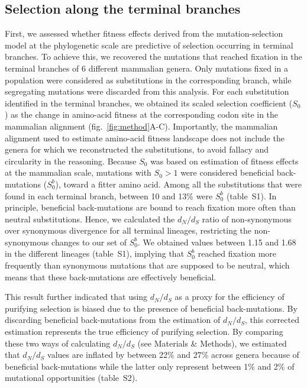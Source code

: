 \documentclass{article}
\newcommand{\dn}{d_N}
\newcommand{\ds}{d_S}
\newcommand{\dnds}{\dn / \ds}
\newcommand{\Sphy}{S_{0}}
\newcommand{\SphyBen}{\Sphy^{b}}
\begin{document}
    \subsection*{Selection along the terminal branches}
    First, we assessed whether fitness effects derived from the mutation-selection model at the phylogenetic scale are predictive of selection occurring in terminal branches.
    To achieve this, we recovered the mutations that reached fixation in the terminal branches of 6 different mammalian genera.
    Only mutations fixed in a population were considered as substitutions in the corresponding branch, while segregating mutations were discarded from this analysis.
    For each substitution identified in the terminal branches, we obtained its scaled selection coefficient ($\Sphy$) as the change in amino-acid fitness at the corresponding codon site in the mammalian alignment (fig.~\ref{fig:method}A-C).
    Importantly, the mammalian alignment used to estimate amino-acid fitness landscape does not include the genera for which we reconstructed the substitutions, to avoid fallacy and circularity in the reasoning.
    Because $\Sphy$ was based on estimation of fitness effects at the mammalian scale, mutations with $\Sphy>1$ were considered beneficial back-mutations ($\SphyBen$), toward a fitter amino acid.
    Among all the substitutions that were found in each terminal branch, between 10 and 13\% were $\SphyBen$ (table~S1).
    In principle, beneficial back-mutations are bound to reach fixation more often than neutral substitutions.
    Hence, we calculated the $\dnds$ ratio of non-synonymous over synonymous divergence for all terminal lineages, restricting the non-synonymous changes to our set of $\SphyBen$.
    We obtained values between 1.15 and 1.68 in the different lineages (table~S1), implying that $\SphyBen$ reached fixation more frequently than synonymous mutations that are supposed to be neutral, which means that these back-mutations are effectively beneficial.

    This result further indicated that using $\dnds$ as a proxy for the efficiency of purifying selection is biased due to the presence of beneficial back-mutations.
    By discarding beneficial back-mutations from the estimation of $\dnds$, this corrected estimation represents the true efficiency of purifying selection.
    By comparing these two ways of calculating $\dnds$ (see Materials \& Methods), we estimated that $\dnds$ values are inflated by between 22\% and 27\% across genera because of beneficial back-mutations while the latter only represent between 1\% and 2\% of mutational opportunities (table~S2).
\end{document}
